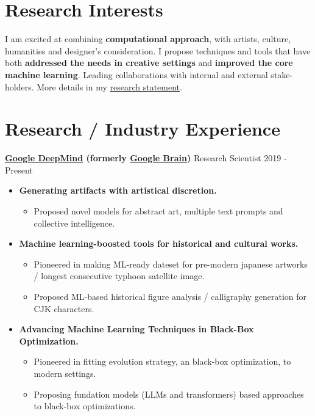 \documentclass[line,margin]{cv}
\makeatletter
\newcommand{\GoogleBrain}{\href{http://research.google.com/teams/brain/}{Google Brain}}
\newcommand{\GoogleDeepMind}{\href{https://www.deepmind.com/}{Google DeepMind}}
\newcommand{\MyWebsite}{\href{https://alantian.net}{alantian.net}}
\newcommand{\MyMail}{\href{mailto:alan.yt.tian@gmail.com}{\nolinkurl{alan.yt.tian@gmail.com}}}
\makeatother
\begin{document}

\address{Research Scientist \textbullet{} \GoogleDeepMind{}  / \MyMail{} / \MyWebsite}

\begin{resume}

\section{Research Interests}

  I am excited at combining \textbf{computational approach}, with artists, culture, humanities and designer's consideration.
  I propose techniques and tools that have both \textbf{addressed the needs in creative settings} and \textbf{improved the core machine learning}. 
  Leading collaborations with internal and external stake-holders.
  More details in my \href{https://alantian.net/research_statement.pdf}{research statement}.

\section{Research / Industry Experience}

  {\bf \GoogleDeepMind{} (formerly \GoogleBrain)} {Research Scientist} \hfill 2019 - Present
    \begin{itemize}
      \item \textbf{Generating artifacts with artistical discretion.}
        \begin{itemize}
          \item Proposed novel models for abstract art, multiple text prompts and collective intelligence.
        \end{itemize}
      \item\textbf{Machine learning-boosted tools for historical and cultural works.}
        \begin{itemize}
          \item Pioneered in making ML-ready dateset for pre-modern japanese artworks / longest consecutive typhoon satellite image.
          \item Proposed ML-based historical figure analysis / calligraphy generation for CJK characters.
        \end{itemize}
      \item \textbf{Advancing Machine Learning Techniques in Black-Box Optimization.}
        \begin{itemize}
          \item Pioneered in fitting evolution strategy, an black-box optimization, to modern settings.
          \item Proposing fundation models (LLMs and transformers) based approaches to black-box optimizations.
        \end{itemize}
    \end{itemize}


\end{resume}
\end{document}
